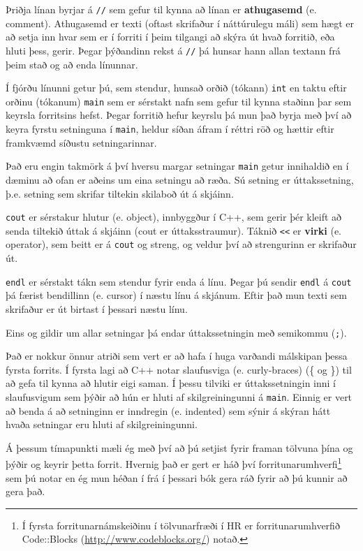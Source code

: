 
Þriðja línan byrjar á  {\tt //} sem gefur til kynna að línan er {\bf athugasemd} (e. comment).
Athugasemd er texti (oftast skrifaður í náttúrulegu máli) sem hægt er að setja inn hvar sem er í forriti í þeim tilgangi að skýra út hvað forritið, eða hluti þess, gerir.
Þegar þýðandinn rekst á {\tt //} þá hunsar hann allan textann frá þeim stað og að enda línunnar.

Í fjórðu línunni getur þú, sem stendur, hunsað orðið (tókann) {\tt int} en taktu eftir orðinu (tókanum) {\tt main} sem er sérstakt nafn sem gefur til kynna staðinn þar sem keyrsla forritsins hefst.
Þegar forritið hefur keyrslu þá mun það byrja með því að keyra fyrstu setninguna í {\tt main}, heldur síðan áfram í réttri röð og hættir eftir framkvæmd síðustu setningarinnar.


Það eru engin takmörk á því hversu margar setningar {\tt main} getur innihaldið en í dæminu að ofan er aðeins um eina setningu að ræða.
Sú setning er úttakssetning, þ.e. setning sem skrifar tiltekin skilaboð út á skjáinn. 

{\tt cout} er sérstakur hlutur (e. object), innbyggður í C++, sem gerir þér kleift að senda tiltekið úttak á skjáinn (cout er úttaksstraumur).
Táknið {\tt <<} er {\bf virki} (e. operator), sem beitt er á {\tt cout} og streng, og veldur því að strengurinn er skrifaður út. 


{\tt endl} er sérstakt tákn sem stendur fyrir enda á línu.
Þegar þú sendir {\tt endl} á {\tt cout} þá færist bendillinn (e. cursor) í næstu línu á skjánum.
Eftir það mun texti sem skrifaður er út birtast í þessari næstu línu. 

Eins og gildir um allar setningar þá endar úttakssetningin með semikommu ({\tt ;}).

Það er nokkur önnur atriði sem vert er að hafa í huga varðandi málskipan þessa fyrsta forrits.
Í fyrsta lagi að C++ notar slaufusviga (e. curly-braces) (\{ og
\}) til að gefa til kynna að hlutir eigi saman.
Í þessu tilviki er úttakssetningin inni í slaufusvigum sem þýðir að 
hún er hluti af skilgreiningunni á {\tt main}. 
Einnig er vert að benda á að setninginn er inndregin (e. indented) sem sýnir á skýran hátt hvaða setningar eru hluti af skilgreiningunni.

Á þessum tímapunkti mæli ég með því að þú setjist fyrir framan tölvuna þína og þýðir og keyrir þetta forrit.
Hvernig það er gert er háð því forritunarumhverfi\footnote{Í fyrsta forritunarnámskeiðinu í tölvunarfræði í HR er forritunarumhverfið Code::Blocks (\url{http://www.codeblocks.org/}) notað.} sem þú notar en ég mun héðan í frá í þessari bók gera ráð fyrir að þú kunnir að gera það.

